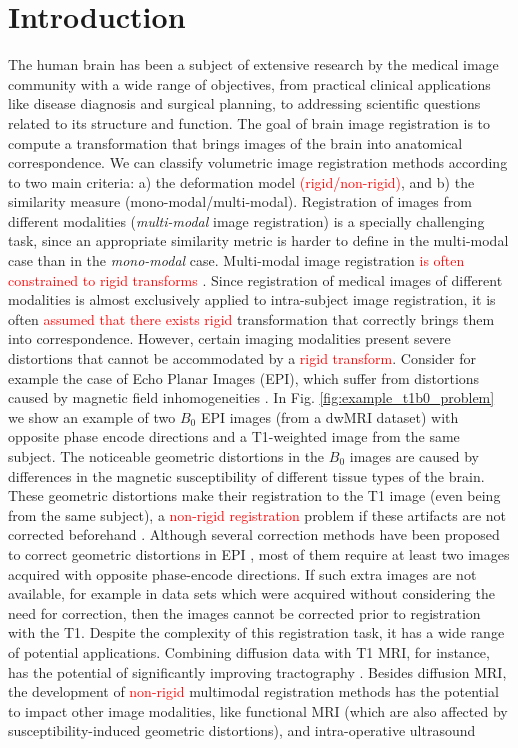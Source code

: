 \vspace{-0.5cm}
\section{Introduction}
The human brain has been a subject of extensive research by the medical image community with a wide range of objectives, from practical clinical applications like disease diagnosis and surgical planning, to addressing scientific questions related to its structure and function. The goal of brain image registration is to compute a transformation that brings images of the brain into anatomical correspondence. We can classify volumetric image registration methods according to two main criteria: a) the deformation model \textcolor{red}{(rigid/non-rigid)}, and b) the similarity measure (mono-modal/multi-modal). Registration of images from different modalities (\emph{multi-modal} image registration) is a specially challenging task, since an appropriate similarity metric is harder to define in the multi-modal case than in the \emph{mono-modal} case. Multi-modal image registration \textcolor{red}{is often constrained to rigid transforms \cite{DeNigris2012, Orchard2008, Orchard2010, Maes1997, Roche1998}}. Since registration of medical images of different modalities is almost exclusively applied to intra-subject image registration, it is often \textcolor{red}{assumed that there exists rigid} transformation that correctly brings them into correspondence. However, certain imaging modalities present severe distortions that cannot be accommodated by a \textcolor{red}{rigid transform}. Consider for example the case of Echo Planar Images (EPI), which suffer from distortions caused by magnetic field inhomogeneities \cite{Tournier2011, Andersson2003}. In Fig. \ref{fig:example_t1b0_problem} we show an example of two $B_{0}$ EPI images (from a dwMRI dataset) with opposite phase encode directions and a T1-weighted image from the same subject. The noticeable geometric distortions in the $B_{0}$ images are caused by differences in the magnetic susceptibility of different tissue types of the brain. These geometric distortions make their registration to the T1 image (even being from the same subject), a \textcolor{red}{non-rigid registration} problem if these artifacts are not corrected beforehand \cite{Bhushan2015}. Although several correction methods have been proposed to correct geometric distortions in EPI \cite{Andersson2003, Holland2010, Ruthotto, Irfanoglu2015}, most of them require at least two images acquired with opposite phase-encode directions. If such extra images are not available, for example in data sets which were acquired without considering the need for correction, then the images cannot be corrected prior to registration with the T1. Despite the complexity of this registration task, it has a wide range of potential applications. Combining diffusion data with T1 MRI, for instance, has the potential of significantly improving tractography \cite{Smith2012, Girard2014}. Besides diffusion MRI, the development of \textcolor{red}{non-rigid} multimodal registration methods has the potential to impact other image modalities, like functional MRI (which are also affected by susceptibility-induced geometric distortions), and intra-operative ultrasound 